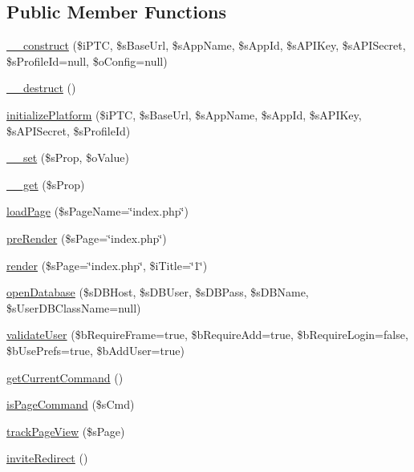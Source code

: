\subsection*{Public Member Functions}
\begin{DoxyCompactItemize}
\item 
\hyperlink{classSFApplication_a00d6c37e1b068b8a5987da26d04b6059}{\_\-\_\-construct} (\$iPTC, \$sBaseUrl, \$sAppName, \$sAppId, \$sAPIKey, \$sAPISecret, \$sProfileId=null, \$oConfig=null)
\item 
\hyperlink{classSFApplication_a421831a265621325e1fdd19aace0c758}{\_\-\_\-destruct} ()
\item 
\hyperlink{classSFApplication_a87941bc6e0f9b9f2d7f1d77f9906eb08}{initializePlatform} (\$iPTC, \$sBaseUrl, \$sAppName, \$sAppId, \$sAPIKey, \$sAPISecret, \$sProfileId)
\item 
\hyperlink{classSFApplication_a9ad3d2905b2a50dfbee6d5f473e758a9}{\_\-\_\-set} (\$sProp, \$oValue)
\item 
\hyperlink{classSFApplication_a9519b5bba407a1a89f324fcc7f26c0e2}{\_\-\_\-get} (\$sProp)
\item 
\hyperlink{classSFApplication_ae1ecd9ab5b45268eb8405fcd83011fb0}{loadPage} (\$sPageName=\char`\"{}index.php\char`\"{})
\item 
\hyperlink{classSFApplication_a1404a2a435e6df83c906a296e1c5461b}{preRender} (\$sPage=\char`\"{}index.php\char`\"{})
\item 
\hyperlink{classSFApplication_a79f6c757cc35a847495f9254503dfa8f}{render} (\$sPage=\char`\"{}index.php\char`\"{}, \$iTitle=\char`\"{}1\char`\"{})
\item 
\hyperlink{classSFApplication_a1a2c07721f5c3d4bcc78eb557e2dfd21}{openDatabase} (\$sDBHost, \$sDBUser, \$sDBPass, \$sDBName, \$sUserDBClassName=null)
\item 
\hyperlink{classSFApplication_a18a992b92ee5ff3ad60ec30d8e0cba60}{validateUser} (\$bRequireFrame=true, \$bRequireAdd=true, \$bRequireLogin=false, \$bUsePrefs=true, \$bAddUser=true)
\item 
\hyperlink{classSFApplication_a245ca49c58ae5e1c2efcdea0369d5b22}{getCurrentCommand} ()
\item 
\hyperlink{classSFApplication_aac5925714018c3a661eba69a737d6597}{isPageCommand} (\$sCmd)
\item 
\hyperlink{classSFApplication_a06cc1f1b035e423dce27f7db925a17c0}{trackPageView} (\$sPage)
\item 
\hyperlink{classSFApplication_a6deb2041e7ee4cbb3511c0f5a7ea8a03}{inviteRedirect} ()

\end{DoxyCompactItemize}
